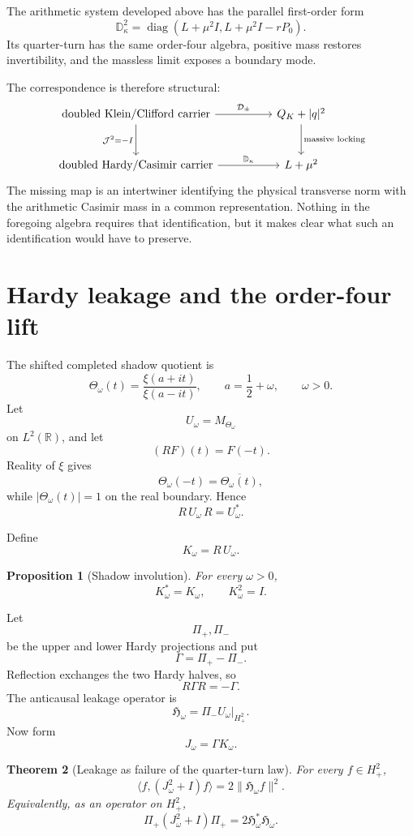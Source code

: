 \documentclass[11pt]{article}
\newtheorem{theorem}{Theorem}[section]
\newtheorem{proposition}[theorem]{Proposition}
\theoremstyle{definition}
\theoremstyle{remark}
\DeclareMathOperator{\diag}{diag}
\newcommand{\R}{\mathbb R}
\begin{document}
The arithmetic system developed above has the parallel first-order form
\[
\mathbb D_\kappa^2
=
\diag(L+\mu^2I,L+\mu^2I-rP_0).
\]
Its quarter-turn has the same order-four algebra, positive mass restores invertibility, and the massless limit exposes a boundary mode.

The correspondence is therefore structural:
\[
\begin{tikzcd}[column sep=huge,row sep=large]
\text{doubled Klein/Clifford carrier}
\arrow[r, "\mathcal D_\pm"]
\arrow[d, "\mathcal J^2=-I"']
&
Q_K+|q|^2
\arrow[d, "\text{massive locking}"]
\\
\text{doubled Hardy/Casimir carrier}
\arrow[r, "\mathbb D_\kappa"]
&
L+\mu^2
\end{tikzcd}
\]
The missing map is an intertwiner identifying the physical transverse norm with the arithmetic Casimir mass in a common representation.  Nothing in the foregoing algebra requires that identification, but it makes clear what such an identification would have to preserve.


\section{Hardy leakage and the order-four lift}

The shifted completed shadow quotient is
\[
\Theta_\omega(t)
=
\frac{\xi(a+it)}{\xi(a-it)},
\qquad
a=\frac12+\omega,
\qquad
\omega>0.
\]
Let
\[
U_\omega=M_{\Theta_\omega}
\]
on \(L^2(\R)\), and let
\[
(RF)(t)=F(-t).
\]
Reality of \(\xi\) gives
\[
\Theta_\omega(-t)
=
\overline{\Theta_\omega(t)},
\]
while \(|\Theta_\omega(t)|=1\) on the real boundary.  Hence
\[
R\,U_\omega\,R=U_\omega^*.
\]

Define
\[
K_\omega=R\,U_\omega.
\]

\begin{proposition}[Shadow involution]
For every \(\omega>0\),
\[
\boxed{
K_\omega^*=K_\omega,
\qquad
K_\omega^2=I.
}
\]
\end{proposition}

Let
\[
\Pi_+,\Pi_-
\]
be the upper and lower Hardy projections and put
\[
\Gamma=\Pi_+-\Pi_-.
\]
Reflection exchanges the two Hardy halves, so
\[
R\Gamma R=-\Gamma.
\]
The anticausal leakage operator is
\[
\mathfrak H_\omega
=
\Pi_-U_\omega\big|_{H^2_+}.
\]
Now form
\[
J_\omega=\Gamma K_\omega.
\]

\begin{theorem}[Leakage as failure of the quarter-turn law]
For every \(f\in H^2_+\),
\[
\boxed{
\langle f,(J_\omega^2+I)f\rangle
=
2\|\mathfrak H_\omega f\|^2.
}
\]
Equivalently, as an operator on \(H^2_+\),
\[
\boxed{
\Pi_+(J_\omega^2+I)\Pi_+
=
2\mathfrak H_\omega^*\mathfrak H_\omega.
}
\]
\end{theorem}
\end{document}
